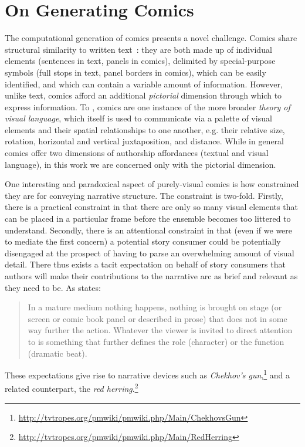 \section{On Generating Comics}

The computational generation of comics presents a novel challenge. Comics 
share structural similarity to written text~\cite{saraceni2016relatedness}: 
they are both made up of individual elements (sentences in text, panels in 
comics), delimited by special-purpose symbols (full stops in text, panel 
borders in comics), which can be easily identified, and which can contain a 
variable amount of information. However, unlike text, comics afford an additional \emph{pictorial} dimension through which to express information. To 
, comics are one instance of the more broader 
\emph{theory of visual language}, which itself is used to communicate via
a palette of visual elements and their spatial relationships to one another,
e.g. their relative size, rotation, horizontal and vertical juxtaposition, 
and distance. While in general comics offer two dimensions of authorship 
affordances (textual and visual language), in this work we are concerned 
only with the pictorial dimension.

One interesting and paradoxical aspect of purely-visual comics is how
constrained they are for conveying narrative structure. The constraint is 
two-fold. Firstly, there is a practical constraint in that there are 
only so many visual elements that can be placed in a particular frame
before the ensemble becomes too littered to understand. Secondly, there
is an attentional constraint in that (even if we were to mediate
the first concern) a potential story consumer could be potentially
disengaged at the prospect of having to parse an overwhelming amount of
visual detail. There thus exists a tacit expectation on behalf of story
consumers that authors will make their contributions to the narrative arc
as brief and relevant as they need to be. As  states:
%
\begin{quote}
	In a mature medium nothing happens, nothing is brought on stage (or 
	screen or comic book panel or described in prose) that does not in
	some way further the action. Whatever the viewer is invited to direct
	attention to is something that further defines the role (character) 
	or the function (dramatic beat).
\end{quote}
%
These expectations give rise to narrative devices such as \emph{Chekhov's gun},\footnote{\url{http://tvtropes.org/pmwiki/pmwiki.php/Main/ChekhovsGun}} and a
related counterpart, the \emph{red herring}.\footnote{\url{http://tvtropes.org/pmwiki/pmwiki.php/Main/RedHerring}}

